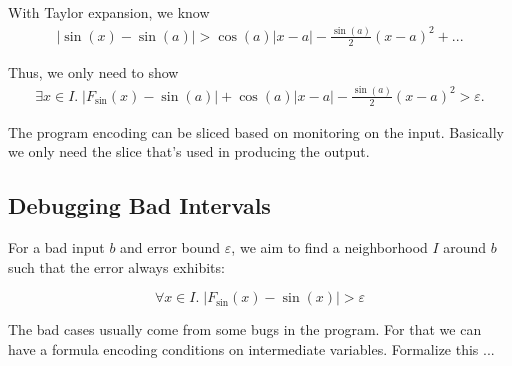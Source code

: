 With Taylor expansion, we know
\begin{eqnarray}
|\sin(x) - \sin(a)| > \cos(a) |x - a| - \frac{\sin(a)}{2}(x-a)^2 + ... %
\end{eqnarray}

Thus, we only need to show
\begin{eqnarray}
\exists x\in I.\; |F_{\sin}(x) - \sin(a)| + \cos(a) |x - a| -
\frac{\sin(a)}{2}(x-a)^2 > \varepsilon.
\end{eqnarray}

The program encoding can be sliced based on monitoring on the input.
Basically we only need the slice that's used in producing the output.

\subsection{Debugging Bad Intervals}

For a bad input $b$ and error bound $\varepsilon$, we aim to find a
neighborhood $I$ around $b$ such that the error always exhibits:

$$ \forall x\in I.\; |F_{\sin}(x) - \sin(x)| > \varepsilon$$

The bad cases usually come from some bugs in the program. For that we
can have a formula encoding conditions on intermediate variables.
Formalize this ...

